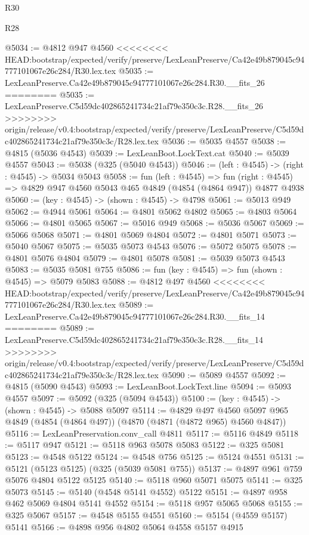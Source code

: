 \begin{lexlean}{R30}
\begin{lexlean}{R28}
\begin{coremodule}
{{{{{{{{{{{{{{{{{{{{{{{{{{{{{{{{{{{{{{{{{{{{{{{{{{{{{{{{{{{{{{{{{{{{{{{{{{{{{{{{{{{{{{{{{{{{{{{{{{{{{{{{{{{{{{{{{{{{{{{{{{{{{{{{{{{{{{{{{{{{{{{@5034 := @4812 @947 @4560
<<<<<<<< HEAD:bootstrap/expected/verify/preserve/LexLeanPreserve/Ca42e49b879045c94777101067e26c284/R30.lex.tex
@5035 := LexLeanPreserve.Ca42e49b879045c94777101067e26c284.R30.__fits_26
========
@5035 := LexLeanPreserve.C5d59dc402865241734c21af79e350c3c.R28.__fits_26
>>>>>>>> origin/release/v0.4:bootstrap/expected/verify/preserve/LexLeanPreserve/C5d59dc402865241734c21af79e350c3c/R28.lex.tex
@5036 := @5035 @4557
@5038 := @4815 (@5036 @4543)
@5039 := LexLeanBoot.LockText.cat
@5040 := @5039 @4557
@5043 := @5038 (@325 (@5040 @4543))
@5046 := (left : @4545) -> (right : @4545) -> @5034 @5043
@5058 := fun (left : @4545) =>
  fun (right : @4545) => @4829 @947 @4560 @5043 @465 @4849 (@4854 (@4864 @947)) @4877 @4938
@5060 := (key : @4545) -> (shown : @4545) -> @4798
@5061 := @5013 @949
@5062 := @4944 @5061
@5064 := @4801 @5062 @4802
@5065 := @4803 @5064
@5066 := @4801 @5065
@5067 := @5016 @949
@5068 := @5036 @5067
@5069 := @5066 @5068
@5071 := @4801 @5069 @4804
@5072 := @4801 @5071
@5073 := @5040 @5067
@5075 := @5035 @5073 @4543
@5076 := @5072 @5075
@5078 := @4801 @5076 @4804
@5079 := @4801 @5078
@5081 := @5039 @5073 @4543
@5083 := @5035 @5081 @755
@5086 := fun (key : @4545) => fun (shown : @4545) => @5079 @5083
@5088 := @4812 @497 @4560
<<<<<<<< HEAD:bootstrap/expected/verify/preserve/LexLeanPreserve/Ca42e49b879045c94777101067e26c284/R30.lex.tex
@5089 := LexLeanPreserve.Ca42e49b879045c94777101067e26c284.R30.__fits_14
========
@5089 := LexLeanPreserve.C5d59dc402865241734c21af79e350c3c.R28.__fits_14
>>>>>>>> origin/release/v0.4:bootstrap/expected/verify/preserve/LexLeanPreserve/C5d59dc402865241734c21af79e350c3c/R28.lex.tex
@5090 := @5089 @4557
@5092 := @4815 (@5090 @4543)
@5093 := LexLeanBoot.LockText.line
@5094 := @5093 @4557
@5097 := @5092 (@325 (@5094 @4543))
@5100 := (key : @4545) -> (shown : @4545) -> @5088 @5097
@5114 := @4829
    @497
    @4560
    @5097
    @965
    @4849
    (@4854 (@4864 @497))
    (@4870 (@4871 (@4872 @965) @4560 @4847))
@5116 := LexLeanPreservation.conv_call @4811
@5117 := @5116 @4849
@5118 := @5117 @947
@5121 := @5118 @963 @5078 @5083
@5122 := @325 @5081
@5123 := @4548 @5122
@5124 := @4548 @756
@5125 := @5124 @4551
@5131 := @5121 (@5123 @5125) (@325 (@5039 @5081 @755))
@5137 := @4897 @961 @759 @5076 @4804 @5122 @5125
@5140 := @5118 @960 @5071 @5075
@5141 := @325 @5073
@5145 := @5140 (@4548 @5141 @4552) @5122
@5151 := @4897 @958 @462 @5069 @4804 @5141 @4552
@5154 := @5118 @957 @5065 @5068
@5155 := @325 @5067
@5157 := @4548 @5155 @4551
@5160 := @5154 (@4559 @5157) @5141
@5166 := @4898 @956 @4802 @5064 @4558 @5157 @4915
}}}}}}}}}}}}}}}}}}}}}}}}}}}}}}}}}}}}}}}}}}}}}}}}}}}}}}}}}}}}}}}}}}}}}}}}}}}}}}}}}}}}}}}}}}}}}}}}}}}}}}}}}}}}}}}}}}}}}}}}}}}}}}}}}}}}}}}}}}}}}}}
\end{coremodule}
\end{lexlean}
\end{lexlean}
